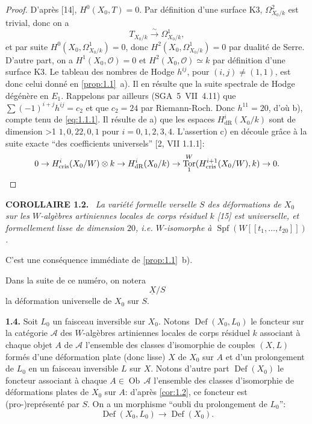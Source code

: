 \documentclass[10pt]{article}
\makeatletter
\DeclareMathOperator{\Def}{Def}
\DeclareMathOperator{\Spf}{Spf}
\DeclareMathOperator{\Tor}{Tor}
\DeclareMathOperator{\Ob}{Ob}
\newcommand{\cris}{\mathrm{cris}}
\newcommand{\UX}{\underline{X}}
\newcommand{\sourceanchor}[2]{\begingroup\def\@currentlabel{#2}\label{#1}\endgroup}
\newenvironment{sourcestatement}[3]{\par\smallskip\noindent\textbf{#1 #2.}\sourceanchor{#3}{#2}\ \itshape}{\par\normalfont\smallskip}
\newcommand{\DPage}[2]{\ifnum#1>1\clearpage\fi\setcounter{page}{#2}}
\makeatother
\begin{document}
\begin{proof}
D'après [14], $H^0(X_0, T) = 0$. Par définition d'une surface K3, $\Omega_{X_0/k}^2$ est trivial, donc on a
\begin{equation}\tag{1.1.1}\label{eq:1.1.1}
T_{X_0/k} \xrightarrow{\sim} \Omega_{X_0/k}^1,
\end{equation}
et par suite $H^0(X_0, \Omega_{X_0/k}^1) = 0$, donc $H^2(X_0, \Omega_{X_0/k}^1) = 0$ par dualité de Serre. D'autre part, on a $H^1(X_0, \mathcal{O}) = 0$ et $H^2(X_0, \mathcal{O}) \simeq k$ par définition d'une surface K3. Le tableau des nombres de Hodge $h^{ij}$, pour $(i,j) \neq (1,1)$, est donc celui donné en \ref{prop:1.1}~a). Il en résulte que la suite spectrale de Hodge dégénère en $E_1$. Rappelons par ailleurs (SGA~5~VII~4.11) que $\sum (-1)^{i+j} h^{ij} = c_2$ et que $c_2 = 24$ par Riemann-Roch. Donc $h^{11} = 20$, d'où b), compte tenu de \eqref{eq:1.1.1}. Il résulte de a) que les espaces $H^i_{\mathrm{dR}}(X_0/k)$ sont de dimension
\DPage{3}{60}
$1, 0, 22, 0, 1$ pour $i = 0, 1, 2, 3, 4$. L'assertion c) en découle grâce à la suite exacte ``des coefficients universels'' [2, VII 1.1.1]:
\[
0 \to H^i_{\cris}(X_0/W) \otimes k \to H^i_{\mathrm{dR}}(X_0/k) \to \Tor^W_1(H^{i+1}_{\cris}(X_0/W), k) \to 0. \qedhere
\]
\end{proof}

\begin{sourcestatement}{COROLLAIRE}{1.2}{cor:1.2}
La variété formelle verselle $S$ des déformations de $X_0$ sur les $W$-algèbres artiniennes locales de corps résiduel $k$ [15] est universelle, et formellement lisse de dimension $20$, i.e. $W$-isomorphe à $\Spf(W[[t_1, \ldots, t_{20}]])$.
\end{sourcestatement}

C'est une conséquence immédiate de \ref{prop:1.1}~b).

Dans la suite de ce numéro, on notera
\begin{equation}\tag{1.3}\label{eq:1.3}
\UX/S
\end{equation}
la déformation universelle de $X_0$ sur $S$.

\noindent\textbf{1.4.}
Soit $L_0$ un faisceau inversible sur $X_0$. Notons $\Def(X_0, L_0)$ le foncteur sur la catégorie $\mathcal{A}$ des $W$-algèbres artiniennes locales de corps résiduel $k$ associant à chaque objet $A$ de $\mathcal{A}$ l'ensemble des classes d'isomorphie de couples $(X, L)$ formés d'une déformation plate (donc lisse) $X$ de $X_0$ sur $A$ et d'un prolongement de $L_0$ en un faisceau inversible $L$ sur $X$. Notons d'autre part $\Def(X_0)$ le foncteur associant à chaque $A \in \Ob\,\mathcal{A}$ l'ensemble des classes d'isomorphie de déformations plates de $X_0$ sur $A$: d'après \ref{cor:1.2}, ce foncteur est (pro-)représenté par $S$. On a un morphisme ``oubli du prolongement de $L_0$'':
\begin{equation}\tag{1.4.1}\label{eq:1.4.1}
\Def(X_0, L_0) \to \Def(X_0).
\end{equation}
\end{document}
